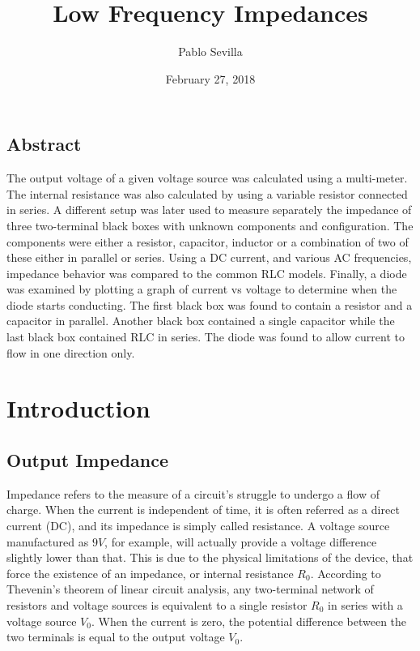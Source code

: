 \documentclass[a4paper]{article}
\title{Low Frequency Impedances}
\date{February 27, 2018}
\author{Pablo Sevilla}
\begin{document}
  \maketitle
  
\begin{center}
  \section*{Abstract}
  \centering
  The output voltage of a given voltage source was calculated using a multi-meter. The internal resistance was also calculated by using a variable resistor connected in series. A different setup was later used to measure separately the impedance of three two-terminal black boxes with unknown components and configuration. The components were either a resistor, capacitor, inductor or a combination of two of these either in parallel or series. Using a DC current, and various AC frequencies, impedance behavior was compared to the common RLC models. Finally, a diode was examined by plotting a graph of current vs voltage to determine when the diode starts conducting. The first black box was found to contain a resistor and a capacitor in parallel. Another black box contained a single capacitor while the last black box contained RLC in series. The diode was found to allow current to flow in one direction only.
\end{center}
  
  \newpage
  
  \section{Introduction}
  \subsection{Output Impedance}
  Impedance refers to the measure of a circuit's struggle to undergo a flow of charge. When the current is independent of time, it is often referred as a direct current (DC), and its impedance is simply called resistance. A voltage source manufactured as $9V$, for example, will actually provide a voltage difference slightly lower than that. This is due to the physical limitations of the device, that force the existence of an impedance, or internal resistance $R_0$. According to Thevenin's theorem of linear circuit analysis, any two-terminal network of resistors and voltage sources is equivalent to a single resistor $R_0$ in series with a voltage source $V_0$. When the current is zero, the potential difference between the two terminals is equal to the output voltage $V_0$. 
  
\end{document}
